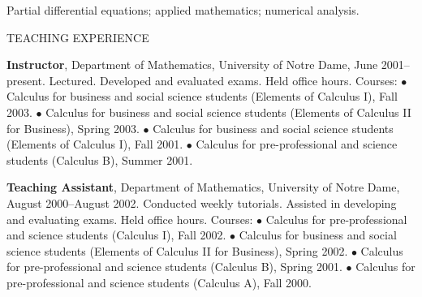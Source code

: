 \documentclass[11pt]{article}
\begin{document}
\vspace{0.1in}
\parbox[t]{0.5in}{\hspace{1in}}
\parbox[t]{6.5in}
     {
       \parbox[t]{5.9in}
       { 
Partial differential equations; applied mathematics; numerical analysis.}

 
   }

\vspace{0.3in}
{\bld TEACHING EXPERIENCE}

\vspace{0.1in}
\parbox[t]{0.5in}{\hspace{1in}}
\parbox[t]{6.5in}
     { {\bf Instructor}, Department of Mathematics, University of Notre
Dame,
						June 2001--present.
Lectured. Developed and evaluated exams.  Held
office hours.  Courses:
       \newline \mbox{} \hspace{5mm}
       $\bullet$  Calculus for business and social
science students (Elements of Calculus I), Fall 2003.
							\newline \mbox{} \hspace{5mm}
       $\bullet$  Calculus for business
and social science students (Elements of Calculus II for Business), 
\newline \mbox{} \hspace{9mm} Spring 2003.
       \newline \mbox{} \hspace{5mm}
       $\bullet$  Calculus for business and social
science students (Elements of Calculus I), Fall 2001.
       \newline \mbox{} \hspace{5mm}
       $\bullet$  Calculus for pre-professional and science
students (Calculus B), Summer 2001.

       \vspace{0.1in}

       {\bf Teaching Assistant}, Department of Mathematics, University
of Notre Dame,
						August 2000--August
2002.  Conducted weekly tutorials.
Assisted in developing and evaluating exams.  Held office hours.  Courses:
							\newline \mbox{} \hspace{5mm}
       $\bullet$  Calculus for pre-professional and science
students (Calculus I), Fall 2002.
       \newline \mbox{} \hspace{5mm}
       $\bullet$  Calculus for business and social
science students (Elements of Calculus II for Business), 
\newline \mbox{} \hspace{9mm} Spring 2002.
       \newline \mbox{} \hspace{5mm}
       $\bullet$  Calculus for pre-professional and science
students (Calculus B), Spring 2001.
       \newline \mbox{} \hspace{5mm}
       $\bullet$  Calculus for pre-professional and science
students (Calculus A), Fall 2000.


     }
\end{document}
